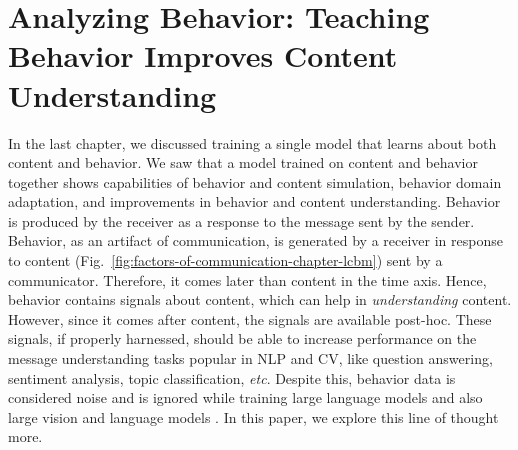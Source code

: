 \chapter{Analyzing Behavior: Teaching Behavior Improves Content Understanding}
\label{chapter:Encoding Behavior To Improve Content Understanding}

In the last chapter, we discussed training a single model that learns about both content and behavior. We saw that a model trained on content and behavior together shows capabilities of behavior and content simulation, behavior domain adaptation, and improvements in behavior and content understanding. Behavior is produced by the receiver as a response to the message sent by the sender. Behavior, as an artifact of communication, is generated by a receiver in response to content (Fig.~\ref{fig:factors-of-communication-chapter-lcbm}) sent by a communicator. Therefore, it comes later than content in the time axis. Hence, behavior contains signals about content, which can help in \textit{understanding} content. However, since it comes after content, the signals are available post-hoc. 
These signals, if properly harnessed, should be able to increase performance on the message understanding tasks popular in NLP and CV, like question answering, sentiment analysis, topic classification, \textit{etc}. Despite this, behavior data is considered noise and is ignored while training large language models \cite{biderman2022datasheet,penedo2023refinedweb} and also large vision and language models \cite{liu2023visual,zhu2023minigpt}. In this paper, we explore this line of thought more.





